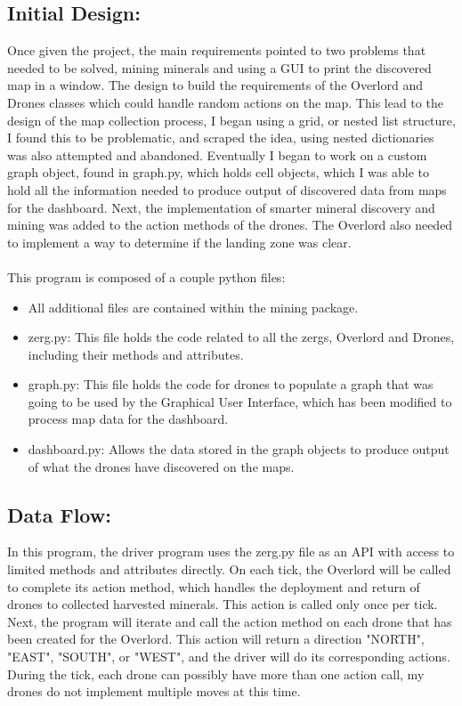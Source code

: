 \documentclass{article}
\begin{document}
\subsection{Initial Design:}
    Once given the project, the main requirements pointed to two problems that needed to be solved, mining minerals and using a GUI to print the discovered map in a window. The design to build the requirements of the Overlord and Drones classes which could handle random actions on the map.  This lead to the design of the map collection process, I began using a grid, or nested list structure, I found this to be problematic, and scraped the idea, using nested dictionaries was also attempted and abandoned. Eventually I began to work on a custom graph object, found in graph.py, which holds cell objects, which I was able to hold all the information needed to produce output of discovered data from maps for the dashboard. Next, the implementation of smarter mineral discovery and mining was added to the action methods of the drones. The Overlord also needed to implement a way to determine if the landing zone was clear. 
	  \\\\
	  This program is composed of a couple python files:
    \begin{itemize}
      \item All additional files are contained within the mining package.
      
        \item zerg.py: This file holds the code related to all the zergs, Overlord and Drones, including their methods and attributes.
        \item graph.py: This file holds the code for drones to populate a graph that was going to be used by the Graphical User Interface, which has been modified to process map data for the dashboard.
        \item dashboard.py: Allows the data stored in the graph objects to produce output of what the drones have discovered on the maps. 
    \end{itemize}

\subsection{Data Flow:}

    In this program, the driver program uses the zerg.py file as an API with access to limited methods and attributes directly. On each tick, the Overlord will be called to complete its action method, which handles the deployment and return of drones to collected harvested minerals. This action is called only once per tick. Next, the program will iterate and call the action method on each drone that has been created for the Overlord.  This action will return a direction "NORTH", "EAST", "SOUTH", or "WEST", and the driver will do its corresponding actions.  During the tick, each drone can possibly have more than one action call, my drones do not implement multiple moves at this time. 
\end{document}
